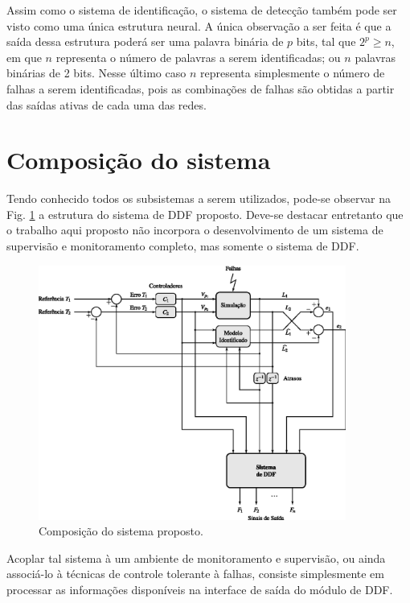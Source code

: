 Assim como o sistema de identificação, o sistema de detecção também pode ser
visto como uma única estrutura neural. A única observação a ser feita é que a
saída dessa estrutura poderá ser uma palavra binária de $p$ bits, tal que $2^p
\geq n$, em que $n$ representa o número de palavras a serem identificadas; ou
$n$ palavras binárias de 2 bits. Nesse último caso $n$ representa simplesmente o
número de falhas a serem identificadas, pois as combinações de falhas são
obtidas a partir das saídas ativas de cada uma das redes.

\section{Composição do sistema}
Tendo conhecido todos os subsistemas a serem utilizados, pode-se observar na
Fig. \ref{fig:composicao} a estrutura do sistema de DDF proposto. Deve-se
destacar entretanto que o trabalho aqui proposto não incorpora o desenvolvimento
de um sistema de supervisão e monitoramento completo, mas somente o sistema de
DDF.

\begin{figure}[htb]
\centering
    \includegraphics[width=0.9\textwidth]{imgs/sistema/eps/composicao}
    \caption{Composição do sistema proposto.}
    \label{fig:composicao}
\end{figure}

Acoplar tal sistema à um ambiente de monitoramento e supervisão, ou ainda
associá-lo à técnicas de controle tolerante à falhas, consiste simplesmente em
processar as informações disponíveis na interface de saída do módulo de DDF.
